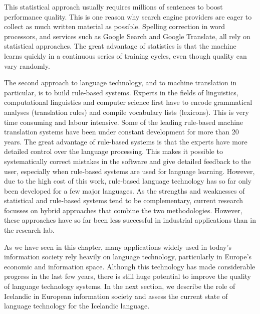 \documentclass{../../metanetpaper}
\begin{document}
\begin{multicols}{2}
This statistical approach usually requires millions of sentences to boost performance quality. This is one reason why search engine providers are eager to collect as much written material as possible. Spelling correction in word processors, and services such as Google Search and Google Translate, all rely on statistical approaches. The great advantage of statistics is that the machine learns quickly in a continuous series of training cycles, even though quality can vary randomly.

The second approach to language technology, and to machine translation in particular, is to build rule-based systems. Experts in the fields of linguistics, computational linguistics and computer science first have to encode grammatical analyses (translation rules) and compile vocabulary lists (lexicons). This is very time consuming and labour intensive. Some of the leading rule-based machine translation systems have been under constant development for more than 20 years. The great advantage of rule-based systems is that the experts have more detailed control over the language processing. This makes it possible to systematically correct mistakes in the software and give detailed feedback to the user, especially when rule-based systems are used for language learning. However, due to the high cost of this work, rule-based language technology has so far only been developed for a few major languages. 
As the strengths and weaknesses of statistical and rule-based systems tend to be complementary, current research focusses on hybrid approaches that combine the two methodologies. However, these approaches have so far been less successful in industrial applications than in the research lab. 

As we have seen in this chapter, many applications widely used in today’s information society rely heavily on language technology, particularly in Europe’s economic and information space. Although this technology has made considerable progress in the last few years, there is still huge potential to improve the quality of language technology systems. In the next section, we describe the role of Icelandic in European information society and assess the current state of language technology for the Icelandic language.
\end{multicols}

\clearpage

\end{document}
